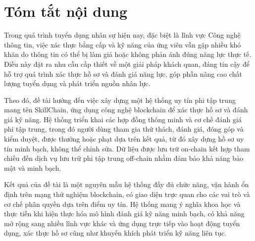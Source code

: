 \chapter*{Tóm tắt nội dung}
Trong quá trình tuyển dụng nhân sự hiện nay, đặc biệt là lĩnh vực Công nghệ thông tin, việc xác thực bằng cấp và kỹ năng của ứng viên vẫn gặp nhiều khó khăn do thông tin có thể bị làm giả hoặc không phản ánh đúng năng lực thực tế. 
Điều này đặt ra nhu cầu cấp thiết về một giải pháp khách quan, đáng tin cậy để hỗ trợ quá trình xác thực hồ sơ và đánh giá năng lực, góp phần nâng cao chất lượng tuyển dụng và phát triển nguồn nhân lực.

Theo đó, đề tài hướng đến việc xây dựng một hệ thống uy tín phi tập trung mang tên SkillChain, ứng dụng công nghệ blockchain để xác thực hồ sơ và đánh giá kỹ năng. 
Hệ thống triển khai các hợp đồng thông minh và cơ chế đánh giá phi tập trung, trong đó người dùng tham gia thử thách, đánh giá, đóng góp và kiểm duyệt, được thưởng hoặc phạt dựa trên kết quả, từ đó xây dựng hồ sơ uy tín minh bạch, không thể chỉnh sửa. 
Dữ liệu được lưu trữ on-chain kết hợp tham chiếu đến dịch vụ lưu trữ phi tập trung off-chain nhằm đảm bảo khả năng bảo mật và minh bạch.

Kết quả của đề tài là một nguyên mẫu hệ thống đầy đủ chức năng, vận hành ổn định trên mạng thử nghiệm blockchain, có giao diện trực quan cho các vai trò và cơ chế phân quyền dựa trên điểm uy tín. 
Hệ thống mang ý nghĩa khoa học và thực tiễn khi hiện thực hóa mô hình đánh giá kỹ năng minh bạch, có khả năng mở rộng sang nhiều lĩnh vực khác và ứng dụng trực tiếp vào hoạt động tuyển dụng, xác thực hồ sơ cũng như khuyến khích phát triển kỹ năng liên tục.